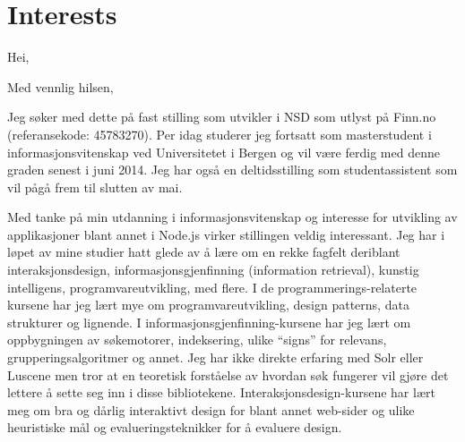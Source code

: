 \documentclass[11pt,a4paper,sans]{moderncv} %
\begin{document}


\section{Interests}

\renewcommand{\listitemsymbol}{-~} %




\clearpage

\date{\today} %
\opening{Hei,} %
\closing{Med vennlig hilsen,} %

\makelettertitle %

Jeg søker med dette på fast stilling som utvikler i NSD som utlyst på Finn.no (referansekode: 45783270). Per idag studerer jeg fortsatt som masterstudent i informasjonsvitenskap ved Universitetet i Bergen og vil være ferdig med denne graden senest i juni 2014. Jeg har også en deltidsstilling som studentassistent som vil pågå frem til slutten av mai.

Med tanke på min utdanning i informasjonsvitenskap og interesse for utvikling av applikasjoner blant annet i Node.js virker stillingen veldig interessant. Jeg har i løpet av mine studier hatt glede av å lære om en rekke fagfelt deriblant interaksjonsdesign, informasjonsgjenfinning (information retrieval), kunstig intelligens, programvareutvikling, med flere. I de programmerings-relaterte kursene har jeg lært mye om programvareutvikling, design patterns, data strukturer og lignende. I informasjonsgjenfinning-kursene har jeg lært om oppbygningen av søkemotorer, indeksering, ulike ``signs'' for relevans, grupperingsalgoritmer og annet. Jeg har ikke direkte erfaring med Solr eller Luscene men tror at en teoretisk forståelse av hvordan søk fungerer vil gjøre det lettere å sette seg inn i disse bibliotekene. Interaksjonsdesign-kursene har lært meg om bra og dårlig interaktivt design for blant annet web-sider og ulike heuristiske mål og evalueringsteknikker for å evaluere design.
\end{document}
